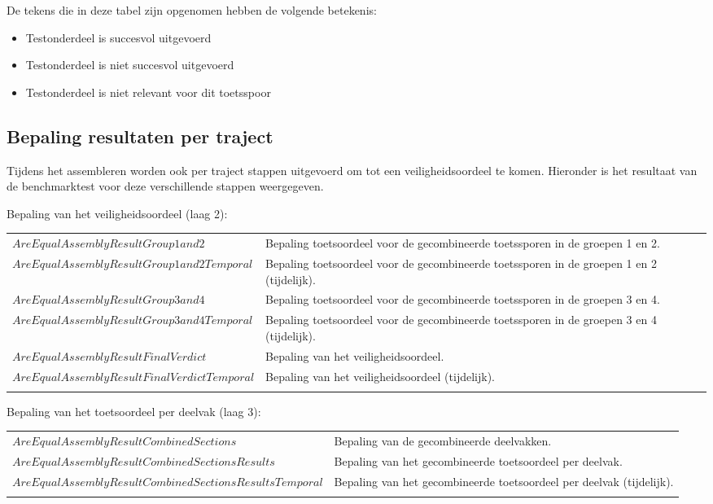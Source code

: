 De tekens die in deze tabel zijn opgenomen hebben de volgende betekenis:
\begin{itemize}
	\item [\cmark] Testonderdeel is succesvol uitgevoerd
	\item [\xmark] Testonderdeel is niet succesvol uitgevoerd
	\item [\nmark] Testonderdeel is niet relevant voor dit toetsspoor
\end{itemize}

\subsection{Bepaling resultaten per traject}
\label{sec:$Order$:pertraject}
Tijdens het assembleren worden ook per traject stappen uitgevoerd om tot een veiligheidsoordeel te komen. Hieronder is het resultaat van de benchmarktest voor deze verschillende stappen weergegeven.

Bepaling van het veiligheidsoordeel (laag 2):
\begin{longtable}[l]{p{0.5cm} l}
	\endhead
	\T
	$AreEqualAssemblyResultGroup1and2$ & Bepaling toetsoordeel voor de gecombineerde toetssporen in de groepen 1 en 2. \B \\ \T
	$AreEqualAssemblyResultGroup1and2Temporal$ & Bepaling toetsoordeel voor de gecombineerde toetssporen in de groepen 1 en 2 (tijdelijk). \B \\ \T
	$AreEqualAssemblyResultGroup3and4$ & Bepaling toetsoordeel voor de gecombineerde toetssporen in de groepen 3 en 4. \B \\ \T
	$AreEqualAssemblyResultGroup3and4Temporal$ & Bepaling toetsoordeel voor de gecombineerde toetssporen in de groepen 3 en 4 (tijdelijk). \B \\ \T
	$AreEqualAssemblyResultFinalVerdict$ & Bepaling van het veiligheidsoordeel. \B \\ \T
	$AreEqualAssemblyResultFinalVerdictTemporal$ & Bepaling van het veiligheidsoordeel (tijdelijk). \B \\ \T
\end{longtable}

Bepaling van het toetsoordeel per deelvak (laag 3):
\begin{longtable}[l]{p{0.5cm} l}
	\endhead
	\T
	$AreEqualAssemblyResultCombinedSections$ & Bepaling van de gecombineerde deelvakken. \B \\ \T
	$AreEqualAssemblyResultCombinedSectionsResults$ & Bepaling van het gecombineerde toetsoordeel per deelvak. \B \\ \T
	$AreEqualAssemblyResultCombinedSectionsResultsTemporal$ & Bepaling van het gecombineerde toetsoordeel per deelvak (tijdelijk). \B \\ \T
\end{longtable}

